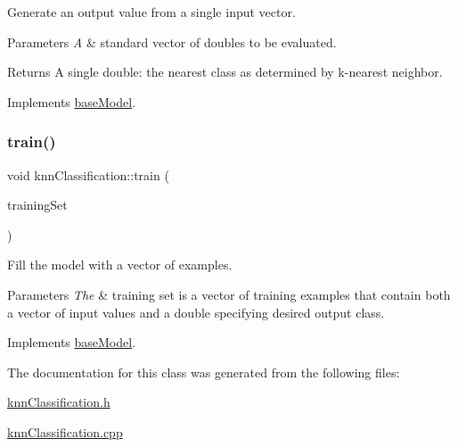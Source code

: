 Generate an output value from a single input vector. 
\begin{DoxyParams}{Parameters}
{\em A} & standard vector of doubles to be evaluated. \\
\hline
\end{DoxyParams}
\begin{DoxyReturn}{Returns}
A single double\+: the nearest class as determined by k-\/nearest neighbor. 
\end{DoxyReturn}


Implements \hyperlink{classbase_model_a07d92b944728ff2b3339d6bceaecb6a3}{base\+Model}.

\mbox{\label{classknn_classification_ae159e53f542d08d04c76760f2e25e843}} 
\subsubsection{\texorpdfstring{train()}{train()}}
{\footnotesize\ttfamily void knn\+Classification\+::train (\begin{DoxyParamCaption}\item[{std\+::vector$<$ \hyperlink{structtraining_example}{training\+Example} $>$}]{training\+Set }\end{DoxyParamCaption})\hspace{0.3cm}{\ttfamily [virtual]}}

Fill the model with a vector of examples.


\begin{DoxyParams}{Parameters}
{\em The} & training set is a vector of training examples that contain both a vector of input values and a double specifying desired output class. \\
\hline
\end{DoxyParams}


Implements \hyperlink{classbase_model_aed9192d6c0f17a1816a55b077baf2523}{base\+Model}.



The documentation for this class was generated from the following files\+:\begin{DoxyCompactItemize}
\item 
\hyperlink{knn_classification_8h}{knn\+Classification.\+h}\item 
\hyperlink{knn_classification_8cpp}{knn\+Classification.\+cpp}\end{DoxyCompactItemize}
